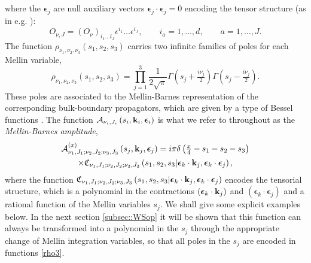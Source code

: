 \documentclass[11pt,a4paper]{article}
\begin{document}
where the $\boldsymbol{\epsilon}_j$ are null auxiliary vectors $\boldsymbol{\epsilon}_j \cdot \boldsymbol{\epsilon}_j = 0$ encoding the tensor structure (as in e.g. \cite{Costa:2011mg}):
\begin{equation}
    O_{\nu,J} = \left(O_{\nu}\right)_{i_1 ...i_J} \epsilon^{i_1} \ldots \epsilon^{i_J}, \qquad i_a = 1, \ldots, d, \qquad a = 1, \ldots, J.
\end{equation}
The function $\rho_{\nu_1,\nu_2,\nu_3}\left(s_1,s_2,s_3\right)$ carries two infinite families of poles for each Mellin variable,
\begin{equation}\label{rho3}
    \rho_{\nu_1,\nu_2,\nu_3}\left(s_1,s_2,s_3\right)=\prod^3_{j=1}\frac{1}{2\sqrt{\pi}}\Gamma\left(s_j+\tfrac{i\nu_j}{2}\right)\Gamma\left(s_j-\tfrac{i\nu_j}{2}\right).
\end{equation}
These poles are associated to the Mellin-Barnes representation of the corresponding bulk-boundary propagators, which are given by a type of Bessel functions \cite{Raju:2010by}. The function ${\cal A}_{\nu_i,J_i}\left(s_i,{\bf k}_i,\boldsymbol{\epsilon}_i\right)$ is what we refer to throughout as the \emph{Mellin-Barnes amplitude}, 
\begin{multline}\label{MBamplitude}
    {\cal A}^{\left(x\right)}_{\nu_1,J_1;\nu_2,J_2;\nu_3,J_3}\left(s_j,{\bf k}_j,\boldsymbol{\epsilon}_j\right) = i \pi \delta\left(\tfrac{x}{4}-s_1-s_2-s_3\right)\\ \times  \mathfrak{C}_{\nu_1,J_1;\nu_2,J_2;\nu_3,J_3}\left(s_1,s_2,s_3|\boldsymbol{\epsilon}_k \cdot {\bf k}_j,\boldsymbol{\epsilon}_k \cdot \boldsymbol{\epsilon}_j\right),
\end{multline}
where the function $\mathfrak{C}_{\nu_1,J_1;\nu_2,J_2;\nu_3,J_3}\left(s_1,s_2,s_3|\boldsymbol{\epsilon}_k \cdot {\bf k}_j,\boldsymbol{\epsilon}_k \cdot \boldsymbol{\epsilon}_j\right)$ encodes the tensorial structure, which is a polynomial in the contractions $\left(\boldsymbol{\epsilon}_k \cdot {\bf k}_j\right)$ and $\left(\boldsymbol{\epsilon}_k \cdot \boldsymbol{\epsilon}_j\right)$ and a rational function of the Mellin variables $s_j$. We shall give some explicit examples below. In the next section \ref{subsec::WSop} it will be shown that this function can always be transformed into a polynomial in the $s_j$ through the appropriate change of Mellin integration variables, so that all poles in the $s_j$ are encoded in functions \eqref{rho3}. 
\end{document}
